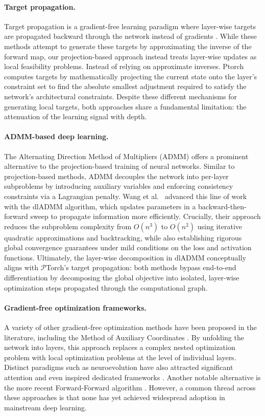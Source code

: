 \documentclass{article}
\theoremstyle{plain}
\theoremstyle{definition}
\theoremstyle{remark}
\begin{document}
\paragraph{Target propagation.}
Target propagation is a  gradient-free learning paradigm where layer-wise targets are propagated backward through the network instead of gradients \cite{DTP}. While these methods attempt to generate these targets by approximating the inverse of the forward map, our projection-based approach instead treats layer-wise updates as local feasibility problems. Instead of relying on approximate inverses. Ptorch computes targets by mathematically projecting the current state onto the layer's constraint set to find the absolute smallest adjustment required to satisfy the network's architectural constraints. Despite these different mechanisms for generating local targets, both approaches share a fundamental limitation: the attenuation of the learning signal with depth. 

\paragraph{ADMM-based deep learning.}
The Alternating Direction Method of Multipliers (ADMM) offers a prominent alternative to the projection-based training of neural networks. Similar to projection-based methods, ADMM decouples the network into per-layer subproblems by introducing auxiliary variables and enforcing consistency constraints via a Lagrangian penalty. Wang et al.~\cite{10.1145/3292500.3330936} advanced this line of work with the dlADMM algorithm, which updates parameters in a backward-then-forward sweep to propagate information more efficiently. Crucially, their approach reduces the subproblem complexity from $O(n^3)$ to $O(n^2)$ using iterative quadratic approximations and backtracking, while also establishing rigorous global convergence guarantees under mild conditions on the loss and activation functions. Ultimately, the layer-wise decomposition in dlADMM conceptually aligns with $\mathcal{P}$Torch's target propagation: both methods bypass end-to-end differentiation by decomposing the global objective into isolated, layer-wise optimization steps propagated through the computational graph.

\paragraph{Gradient-free optimization frameworks.}
A variety of other gradient-free optimization methods have been proposed in the literature, including the Method of Auxiliary Coordinates \cite{carreira2014distributed}. By unfolding the network into layers, this approach replaces a complex nested optimization problem with local optimization problems at the level of individual layers. Distinct paradigms such as neuroevolution have also attracted significant attention and even inspired dedicated frameworks \cite{tang2022evojax}. Another notable alternative is the more recent Forward-Forward algorithm \cite{hinton2022forward}. However, a common thread across these approaches is that none has yet achieved widespread adoption in mainstream deep learning.
\end{document}
